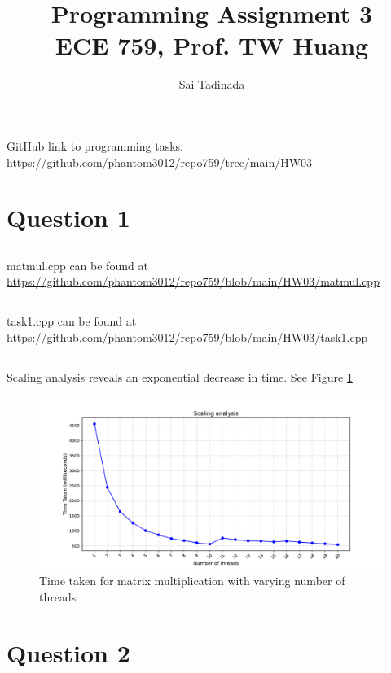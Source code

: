 \documentclass[12pt]{article}
\title{Programming Assignment 3 \\ \small{ECE 759, Prof. TW Huang}}
\author{Sai Tadinada}
\date{}
\begin{document}
\maketitle

GitHub link to programming tasks: \\ \url{https://github.com/phantom3012/repo759/tree/main/HW03}

\section{Question 1}
\subsection{}
matmul.cpp can be found at \url{https://github.com/phantom3012/repo759/blob/main/HW03/matmul.cpp}

\subsection{}
task1.cpp can be found at \url{https://github.com/phantom3012/repo759/blob/main/HW03/task1.cpp}

\subsection{}
Scaling analysis reveals an exponential decrease in time. See Figure \ref{fig:threads_change_task1}
\begin{figure}[ht]
    \includegraphics[width = \textwidth]{task1.pdf}
    \caption{Time taken for matrix multiplication with varying number of threads}
    \label{fig:threads_change_task1}
\end{figure}
\newpage

\section{Question 2}
\end{document}
